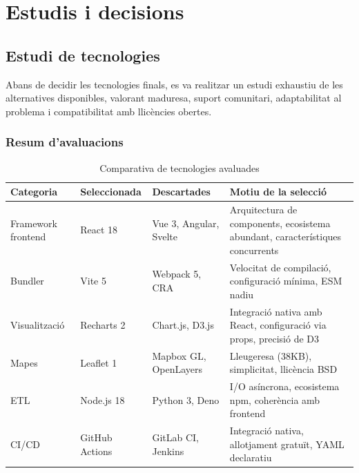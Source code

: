 

\chapter{Estudis i decisions}
\label{Ch:Studies}

\section{Estudi de tecnologies}

Abans de decidir les tecnologies finals, es va realitzar un estudi exhaustiu de les alternatives disponibles, valorant maduresa, suport comunitari, adaptabilitat al problema i compatibilitat amb llicències obertes.

\subsection{Resum d'avaluacions}

\begin{table}[h]
\centering
\caption{Comparativa de tecnologies avaluades}
\begin{tabular}{|l|l|l|p{4cm}|}
\hline
\textbf{Categoria} & \textbf{Seleccionada} & \textbf{Descartades} & \textbf{Motiu de la selecció} \\
\hline
Framework frontend & React 18 & Vue 3, Angular, Svelte & Arquitectura de components, ecosistema abundant, característiques concurrents \\
\hline
Bundler & Vite 5 & Webpack 5, CRA & Velocitat de compilació, configuració mínima, ESM nadiu \\
\hline
Visualització & Recharts 2 & Chart.js, D3.js & Integració nativa amb React, configuració via props, precisió de D3 \\
\hline
Mapes & Leaflet 1 & Mapbox GL, OpenLayers & Lleugeresa (38KB), simplicitat, llicència BSD \\
\hline
ETL & Node.js 18 & Python 3, Deno & I/O asíncrona, ecosistema npm, coherència amb frontend \\
\hline
CI/CD & GitHub Actions & GitLab CI, Jenkins & Integració nativa, allotjament gratuït, YAML declaratiu \\
\hline
\end{tabular}
\end{table}

